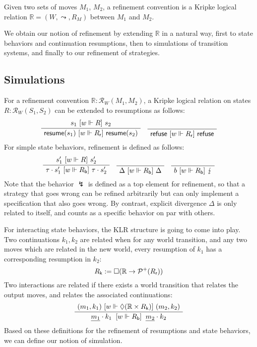 \begin{definition}
Given two sets of moves $M_1$, $M_2$,
a refinement convention
is a Kripke logical relation $\mathbb{R} = (W, \leadsto, R_M)$
between $M_1$ and $M_2$.
\end{definition}

We obtain our notion of refinement by extending $\mathbb{R}$
in a natural way,
first to state behaviors and continuation resumptions,
then to simulations of transition systems,
and finally to our refinement of strategies.

\subsection{Simulations}

For a refinement convention $\mathbb{R} : \mathcal{R}_W(M_1, M_2)$,
a Kripke logical relation on states $R : \mathcal{R}_W(S_1, S_2)$
can be extended to resumptions as follows:
\[
  \AxiomC{$s_1 \ifr{w \Vdash R} s_2$}
  \UnaryInfC{$\kw{resume}(s_1) \ifr{w \Vdash R_\kw{r}} \kw{resume}(s_2)$}
  \DisplayProof
  \quad
  \AxiomC{\rule{0pt}{\baselineskip}}
  \UnaryInfC{$\kw{refuse} \ifr{w \Vdash R_\kw{r}} \kw{refuse}$}
  \DisplayProof
\]
For simple state behaviors,
refinement is defined as follows:
\[
  \AxiomC{$s_1' \ifr{w \Vdash R} s_2'$}
  \UnaryInfC{$\tau \cdot s_1' \ifr{w \Vdash R_\kw{b}} \tau \cdot s_2'$}
  \DisplayProof
  \quad
  \AxiomC{\rule{0pt}{\baselineskip}}
  \UnaryInfC{$\Delta \ifr{w \Vdash R_\kw{b}} \Delta$}
  \DisplayProof
  \quad
  \AxiomC{\rule{0pt}{\baselineskip}}
  \UnaryInfC{$b \ifr{w \Vdash R_\kw{b}} \lightning$}
  \DisplayProof
\]
Note that the behavior $\lightning$ is defined as a top element
for refinement,
so that a strategy that goes wrong can be refined arbitrarily
but can only implement a specification that
also goes wrong.
By contrast,
explicit divergence $\Delta$
is only related to itself,
and counts as a specific behavior on par with others.

For interacting state behaviors,
the KLR structure is going to come into play.
Two continuations $k_1, k_2$ are related when
for any world transition,
and any two moves which are related in the new world,
every resumption of $k_1$ has a corresponding resumption in $k_2$:
\[
  R_{ \mathsf{k} } := \Box (\mathbb{R} \rightarrow \mathcal{P}^+(R_{ \mathsf{r} }))
\]
Two interactions are related
if there exists a world transition that relates the output moves,
and relates the associated continuations:
\[
  \AxiomC{$(m_1, k_1) \ifr{w \Vdash \Diamond (\mathbb{R} \times R_\kw{k})} (m_2, k_2)$}
  \UnaryInfC{$
	{\underline{m_1} \cdot k_1}
	\: \ifr{w \Vdash R_\kw{b}} \:
	{\underline{m_2} \cdot k_2}$}
  \DisplayProof
\]
Based on these definitions for the refinement of
resumptions and state behaviors,
we can define our notion of simulation.

